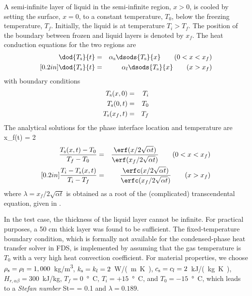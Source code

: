 \documentclass[11pt]{book}
\begin{document}
A semi-infinite layer of liquid in the semi-infinite region, $x>0$,
is cooled by setting the surface, $x=0$, to a constant temperature, $T_0$,
below the freezing temperature, $T_f$. Initially, the liquid is at temperature $T_i > T_f$. The position of the boundary between frozen and liquid layers
is denoted by $x_f$. The heat conduction equations for the two regions are
\begin{eqnarray}
\dod{T_{\rm s}}{t} & = & \alpha_{\rm s} \dsods{T_{\rm s}}{x} \quad \quad (0 < x < x_f) \\ [0.2in]
\dod{T_{\rm s}}{t} & = & \alpha_l \dsods{T_{\rm s}}{x} \quad \quad (x > x_f)
\end{eqnarray}
with boundary conditions
\begin{eqnarray}
T_{\rm s}(x,0)   &= & T_i \nonumber \\
T_{\rm s}(0,t)   &= & T_0 \nonumber \\
T_{\rm s}(x_f,t) &= & T_f \nonumber
\end{eqnarray}
The analytical solutions for the phase interface location and temperature are \cite{Carslaw:1}
\be
x_f(t) = 2 \lambda {}
\ee
\begin{eqnarray}
\frac{T_{\rm s}(x,t)-T_0}{T_f - T_0} &=& \frac{\erf(x/2\sqrt{\alpha t})} {\erf (x_f/2\sqrt{\alpha t})} \quad \quad (0 < x < x_f) \\ [0.2in]
\frac{T_i-T_{\rm s}(x,t)}{T_i - T_f} &=& \frac{\erfc(x/2\sqrt{\alpha t})}{\erfc(x_f/2\sqrt{\alpha t})} \quad \quad (x > x_f)
\end{eqnarray}
where $\lambda = x_f /2\sqrt{\alpha t}$ is obtained as a root of the (complicated)
transcendental equation, given in \cite{Carslaw:1}.

In the test case, the thickness of the liquid layer cannot be infinite. For practical purposes, a 50 cm thick layer was found to be sufficient.
The fixed-temperature boundary condition, which is formally not available for the condensed-phase heat transfer solver in FDS,
is implemented by assuming that the gas temperature is $T_0$ with a very high heat convection coefficient.
For material properties, we choose $\rho_{\rm s} = \rho_l =1,000$~\si{kg/m^3},
$k_{\rm s} = k_l = 2$~\si{W/(m.K)}, $c_{\rm s} = c_l = 2$~\si{kJ/(kg.K)}, $H_{r,\alpha\beta}=300$~kJ/kg, $T_f = 0$~\si{\degree C}, $T_i = +15$~\si{\degree C},
and $T_0 = -15$~\si{\degree C}, which leads to a {\em Stefan number}
\be
\hbox{St}= = 0.1
\ee
and $\lambda = 0.189$.
\end{document}
